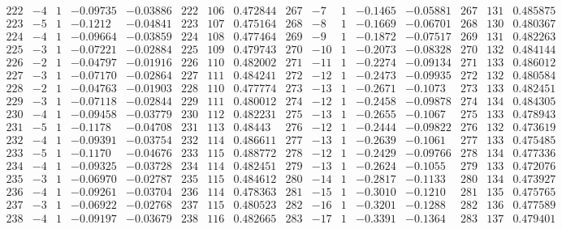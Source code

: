 \documentclass[11pt,reqno,a4letter]{article}
\numberwithin{figure}{section}
\numberwithin{table}{section}
\theoremstyle{plain}
\numberwithin{theorem}{section}
\theoremstyle{definition}
\begin{document}
\begin{table}[ht!]
\begin{equation*}
{\begin{array}{ccccc|ccc|ccccc|ccc}
 222 & -4 & 1 & -0.09735 & -0.03886 & 222 & 106 & 0.472844 & 267 & -7 & 1 & -0.1465 & -0.05881 & 267 & 131 & 0.485875 \\
 223 & -5 & 1 & -0.1212 & -0.04841 & 223 & 107 & 0.475164 & 268 & -8 & 1 & -0.1669 & -0.06701 & 268 & 130 & 0.480367 \\
 224 & -4 & 1 & -0.09664 & -0.03859 & 224 & 108 & 0.477464 & 269 & -9 & 1 & -0.1872 & -0.07517 & 269 & 131 & 0.482263 \\
 225 & -3 & 1 & -0.07221 & -0.02884 & 225 & 109 & 0.479743 & 270 & -10 & 1 & -0.2073 & -0.08328 & 270 & 132 & 0.484144 \\
 226 & -2 & 1 & -0.04797 & -0.01916 & 226 & 110 & 0.482002 & 271 & -11 & 1 & -0.2274 & -0.09134 & 271 & 133 & 0.486012 \\
 227 & -3 & 1 & -0.07170 & -0.02864 & 227 & 111 & 0.484241 & 272 & -12 & 1 & -0.2473 & -0.09935 & 272 & 132 & 0.480584 \\
 228 & -2 & 1 & -0.04763 & -0.01903 & 228 & 110 & 0.477774 & 273 & -13 & 1 & -0.2671 & -0.1073 & 273 & 133 & 0.482451 \\
 229 & -3 & 1 & -0.07118 & -0.02844 & 229 & 111 & 0.480012 & 274 & -12 & 1 & -0.2458 & -0.09878 & 274 & 134 & 0.484305 \\
 230 & -4 & 1 & -0.09458 & -0.03779 & 230 & 112 & 0.482231 & 275 & -13 & 1 & -0.2655 & -0.1067 & 275 & 133 & 0.478943 \\
 231 & -5 & 1 & -0.1178 & -0.04708 & 231 & 113 & 0.48443 & 276 & -12 & 1 & -0.2444 & -0.09822 & 276 & 132 & 0.473619 \\
 232 & -4 & 1 & -0.09391 & -0.03754 & 232 & 114 & 0.486611 & 277 & -13 & 1 & -0.2639 & -0.1061 & 277 & 133 & 0.475485 \\
 233 & -5 & 1 & -0.1170 & -0.04676 & 233 & 115 & 0.488772 & 278 & -12 & 1 & -0.2429 & -0.09766 & 278 & 134 & 0.477336 \\
 234 & -4 & 1 & -0.09325 & -0.03728 & 234 & 114 & 0.482451 & 279 & -13 & 1 & -0.2624 & -0.1055 & 279 & 133 & 0.472076 \\
 235 & -3 & 1 & -0.06970 & -0.02787 & 235 & 115 & 0.484612 & 280 & -14 & 1 & -0.2817 & -0.1133 & 280 & 134 & 0.473927 \\
 236 & -4 & 1 & -0.09261 & -0.03704 & 236 & 114 & 0.478363 & 281 & -15 & 1 & -0.3010 & -0.1210 & 281 & 135 & 0.475765 \\
 237 & -3 & 1 & -0.06922 & -0.02768 & 237 & 115 & 0.480523 & 282 & -16 & 1 & -0.3201 & -0.1288 & 282 & 136 & 0.477589 \\
 238 & -4 & 1 & -0.09197 & -0.03679 & 238 & 116 & 0.482665 & 283 & -17 & 1 & -0.3391 & -0.1364 & 283 & 137 & 0.479401 \\

\end{array}}
\end{equation*}
\end{table}
\end{document}
